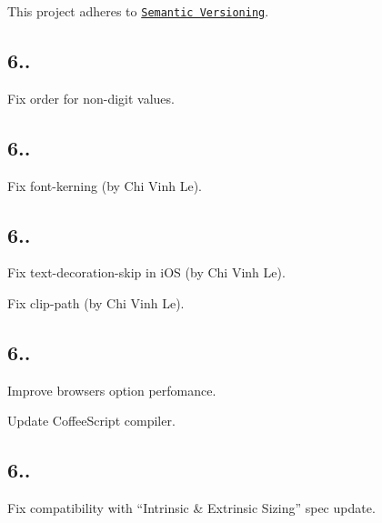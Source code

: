 This project adheres to \href{http://semver.org/}{\tt Semantic Versioning}.

\subsection*{6..}


\begin{DoxyItemize}
\item Fix {\ttfamily order} for non-\/digit values.
\end{DoxyItemize}

\subsection*{6..}


\begin{DoxyItemize}
\item Fix {\ttfamily font-\/kerning} (by Chi Vinh Le).
\end{DoxyItemize}

\subsection*{6..}


\begin{DoxyItemize}
\item Fix {\ttfamily text-\/decoration-\/skip} in i\+OS (by Chi Vinh Le).
\item Fix {\ttfamily clip-\/path} (by Chi Vinh Le).
\end{DoxyItemize}

\subsection*{6..}


\begin{DoxyItemize}
\item Improve {\ttfamily browsers} option perfomance.
\item Update Coffee\+Script compiler.
\end{DoxyItemize}

\subsection*{6..}


\begin{DoxyItemize}
\item Fix compatibility with “\+Intrinsic \& Extrinsic Sizing” spec update.
\end{DoxyItemize}

